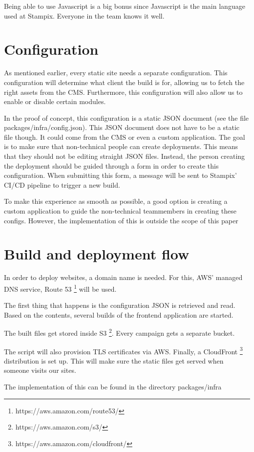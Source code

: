 Being able to use Javascript is a big bonus since Javascript is the main language used at Stampix. Everyone in the team knows it well.

\section{Configuration}

As mentioned earlier, every static site needs a separate configuration. 
This configuration will determine what client the build is for, allowing us to fetch the right assets from the CMS. 
Furthermore, this configuration will also allow us to enable or disable certain modules. 

In the proof of concept, this configuration is a static JSON document (see the file packages/infra/config.json). This JSON document does not have to be a static file though. 
It could come from the CMS or even a custom application. 
The goal is to make sure that non-technical people can create deployments. This means that they should not be editing straight JSON files.
Instead, the person creating the deployment should be guided through a form in order to create this configuration. 
When submitting this form, a message will be sent to Stampix' CI/CD pipeline to trigger a new build. 

To make this experience as smooth as possible, a good option is creating a custom application to guide the non-technical teammembers in creating these configs. 
However, the implementation of this is outside the scope of this paper

\section{Build and deployment flow}

In order to deploy websites, a domain name is needed. For this, AWS' managed DNS service, Route 53 \footnote{https://aws.amazon.com/route53/} will be used.

The first thing that happens is the configuration JSON is retrieved and read. Based on the contents, several builds of the frontend application are started.

The built files get stored inside S3 \footnote{https://aws.amazon.com/s3/}. Every campaign gets a separate bucket.

The script will also provision TLS certificates via AWS. 
Finally, a CloudFront \footnote{https://aws.amazon.com/cloudfront/} distribution is set up. This will make sure the static files get served when someone visits our sites.

The implementation of this can be found in the directory packages/infra